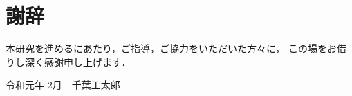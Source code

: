 \chapter*{謝辞}
\thispagestyle{empty}
\label{thankyou}

\newpage

本研究を進めるにあたり，ご指導，ご協力をいただいた方々に，
この場をお借りし深く感謝申し上げます．
\\

\begin{flushright}
令和元年 2月　千葉工太郎
\end{flushright}


\newpage

